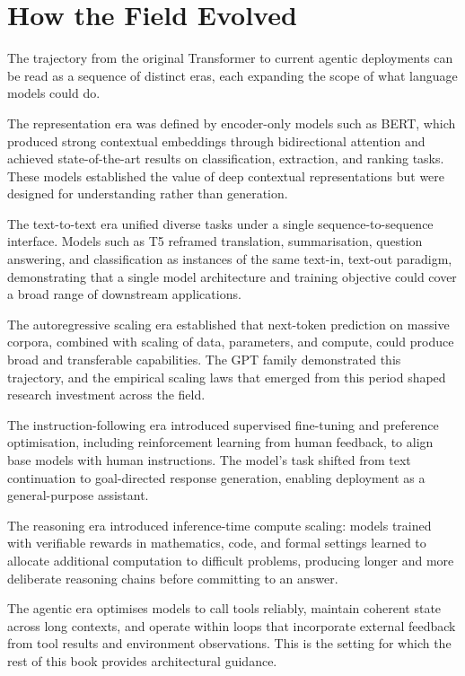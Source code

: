 \section{How the Field Evolved}

The trajectory from the original Transformer to current agentic deployments can be read
as a sequence of distinct eras, each expanding the scope of what language models could
do.

The representation era was defined by encoder-only models such as BERT, which produced
strong contextual embeddings through bidirectional attention and achieved state-of-the-art
results on classification, extraction, and ranking tasks. These models established the
value of deep contextual representations but were designed for understanding rather than
generation.

The text-to-text era unified diverse tasks under a single sequence-to-sequence interface.
Models such as T5 reframed translation, summarisation, question answering, and
classification as instances of the same text-in, text-out paradigm, demonstrating that
a single model architecture and training objective could cover a broad range of
downstream applications.

The autoregressive scaling era established that next-token prediction on massive corpora,
combined with scaling of data, parameters, and compute, could produce broad and
transferable capabilities. The GPT family demonstrated this trajectory, and the empirical
scaling laws that emerged from this period shaped research investment across the field.

The instruction-following era introduced supervised fine-tuning and preference
optimisation, including reinforcement learning from human feedback, to align base
models with human instructions. The model's task shifted from text continuation to
goal-directed response generation, enabling deployment as a general-purpose assistant.

The reasoning era introduced inference-time compute scaling: models trained with
verifiable rewards in mathematics, code, and formal settings learned to allocate
additional computation to difficult problems, producing longer and more deliberate
reasoning chains before committing to an answer.

The agentic era optimises models to call tools reliably, maintain coherent state across
long contexts, and operate within loops that incorporate external feedback from tool
results and environment observations. This is the setting for which the rest of this
book provides architectural guidance.

